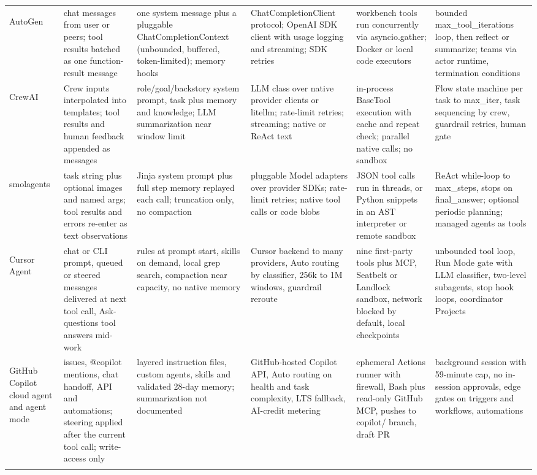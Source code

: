 \begin{longtable}{@{}>{\bfseries\raggedright\arraybackslash}p{1.6cm}*{5}{>{\raggedright\arraybackslash}p{2.84cm}}@{}}
\addlinespace
AutoGen & chat messages from user or peers; tool results batched as one function-result message & one system message plus a pluggable ChatCompletionContext (unbounded, buffered, token-limited); memory hooks & ChatCompletionClient protocol; OpenAI SDK client with usage logging and streaming; SDK retries & workbench tools run concurrently via asyncio.gather; Docker or local code executors & bounded max\_tool\_iterations loop, then reflect or summarize; teams via actor runtime, termination conditions \\
\addlinespace
CrewAI & Crew inputs interpolated into templates; tool results and human feedback appended as messages & role/goal/backstory system prompt, task plus memory and knowledge; LLM summarization near window limit & LLM class over native provider clients or litellm; rate-limit retries; streaming; native or ReAct text & in-process BaseTool execution with cache and repeat check; parallel native calls; no sandbox & Flow state machine per task to max\_iter, task sequencing by crew, guardrail retries, human gate \\
\addlinespace
smolagents & task string plus optional images and named args; tool results and errors re-enter as text observations & Jinja system prompt plus full step memory replayed each call; truncation only, no compaction & pluggable Model adapters over provider SDKs; rate-limit retries; native tool calls or code blobs & JSON tool calls run in threads, or Python snippets in an AST interpreter or remote sandbox & ReAct while-loop to max\_steps, stops on final\_answer; optional periodic planning; managed agents as tools \\
\addlinespace
Cursor Agent & chat or CLI prompt, queued or steered messages delivered at next tool call, Ask-questions tool answers mid-work & rules at prompt start, skills on demand, local grep search, compaction near capacity, no native memory & Cursor backend to many providers, Auto routing by classifier, 256k to 1M windows, guardrail reroute & nine first-party tools plus MCP, Seatbelt or Landlock sandbox, network blocked by default, local checkpoints & unbounded tool loop, Run Mode gate with LLM classifier, two-level subagents, stop hook loops, coordinator Projects \\
\addlinespace
GitHub Copilot cloud agent and agent mode & issues, @copilot mentions, chat handoff, API and automations; steering applied after the current tool call; write-access only & layered instruction files, custom agents, skills and validated 28-day memory; summarization not documented & GitHub-hosted Copilot API, Auto routing on health and task complexity, LTS fallback, AI-credit metering & ephemeral Actions runner with firewall, Bash plus read-only GitHub MCP, pushes to copilot/ branch, draft PR & background session with 59-minute cap, no in-session approvals, edge gates on triggers and workflows, automations \\
\addlinespace
\end{longtable}
\endgroup
